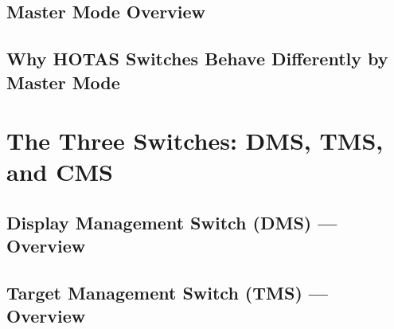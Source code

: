 \documentclass[11pt, a4paper, twoside]{report}
\begin{document}
\subsection{Master Mode Overview}
\label{sec:C2-S2-S1}

\subsection{Why HOTAS Switches Behave Differently by Master Mode}
\label{sec:C2-S2-S2}

\section{The Three Switches: DMS, TMS, and CMS}
\label{sec:C2-S3}

\subsection{Display Management Switch (DMS) — Overview}
\label{sec:C2-S3-S1}

\subsection{Target Management Switch (TMS) — Overview}
\label{sec:C2-S3-S2}

\end{document}
